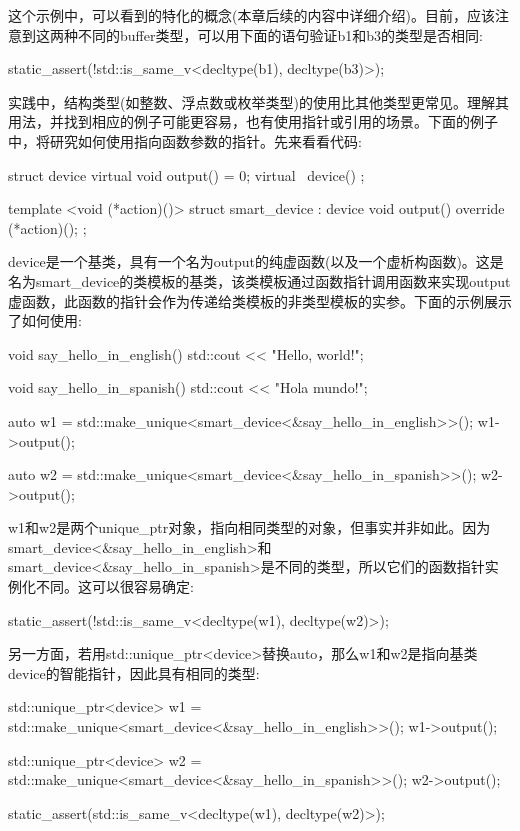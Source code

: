 这个示例中，可以看到的特化的概念(本章后续的内容中详细介绍)。目前，应该注意到这两种不同的buffer类型，可以用下面的语句验证b1和b3的类型是否相同:

\begin{cpp}
static_assert(!std::is_same_v<decltype(b1), decltype(b3)>);
\end{cpp}

实践中，结构类型(如整数、浮点数或枚举类型)的使用比其他类型更常见。理解其用法，并找到相应的例子可能更容易，也有使用指针或引用的场景。下面的例子中，将研究如何使用指向函数参数的指针。先来看看代码:

\begin{cpp}
struct device
{
	virtual void output() = 0;
	virtual ~device() {}
};

template <void (*action)()>
struct smart_device : device
{
	void output() override
	{
		(*action)();
	}
};
\end{cpp}

device是一个基类，具有一个名为output的纯虚函数(以及一个虚析构函数)。这是名为smart\_device的类模板的基类，该类模板通过函数指针调用函数来实现output虚函数，此函数的指针会作为传递给类模板的非类型模板的实参。下面的示例展示了如何使用:

\begin{cpp}
void say_hello_in_english()
{
	std::cout << "Hello, world!\n";
}

void say_hello_in_spanish()
{
	std::cout << "Hola mundo!\n";
}

auto w1 =
	std::make_unique<smart_device<&say_hello_in_english>>();
w1->output();

auto w2 =
	std::make_unique<smart_device<&say_hello_in_spanish>>();
w2->output();
\end{cpp}

w1和w2是两个unique\_ptr对象，指向相同类型的对象，但事实并非如此。因为smart\_device<\&say\_hello\_in\_english>和smart\_device<\&say\_hello\_in\_spanish>是不同的类型，所以它们的函数指针实例化不同。这可以很容易确定:

\begin{cpp}
static_assert(!std::is_same_v<decltype(w1), decltype(w2)>);
\end{cpp}

另一方面，若用std::unique\_ptr<device>替换auto，那么w1和w2是指向基类device的智能指针，因此具有相同的类型:

\begin{cpp}
std::unique_ptr<device> w1 =
	std::make_unique<smart_device<&say_hello_in_english>>();
w1->output();

std::unique_ptr<device> w2 =
	std::make_unique<smart_device<&say_hello_in_spanish>>();
w2->output();

static_assert(std::is_same_v<decltype(w1), decltype(w2)>);
\end{cpp}

